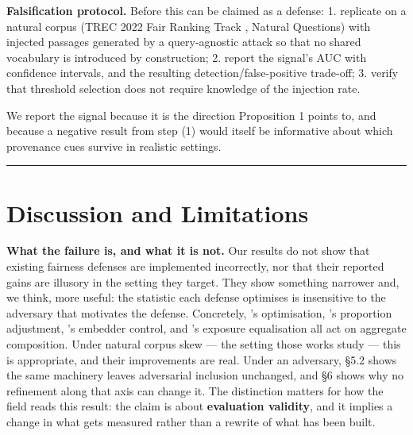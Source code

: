 \documentclass[authoryear,review,3p,times]{elsarticle}
\begin{document}
\textbf{Falsification protocol.} Before this can be claimed as a defense:
1. replicate on a natural corpus (TREC 2022 Fair Ranking Track \citep{ekstrand2022b}, Natural Questions) with injected passages generated by a query-agnostic attack \citeyearpar{zhang2025} so that no shared vocabulary is introduced by construction;
2. report the signal's AUC with confidence intervals, and the resulting detection/false-positive trade-off;
3. verify that threshold selection does not require knowledge of the injection rate.

We report the signal because it is the direction Proposition 1 points to, and because a negative result from step (1) would itself be informative about which provenance cues survive in realistic settings.

\begin{center}\rule{0.5\linewidth}{0.5pt}\end{center}

\section{Discussion and Limitations}\label{discussion-and-limitations}

\textbf{What the failure is, and what it is not.} Our results do not show that existing fairness defenses are implemented incorrectly, nor that their reported gains are illusory in the setting they target. They show something narrower and, we think, more useful: the statistic each defense optimises is insensitive to the adversary that motivates the defense. Concretely, \citeauthor{zhao2026}'s optimisation, \citeauthor{wu2025}'s proportion adjustment, \citeauthor{kim2025a}'s embedder control, and \citeauthor{kim2025b}'s exposure equalisation all act on aggregate composition. Under natural corpus skew --- the setting those works study --- this is appropriate, and their improvements are real. Under an adversary, §5.2 shows the same machinery leaves adversarial inclusion unchanged, and §6 shows why no refinement along that axis can change it. The distinction matters for how the field reads this result: the claim is about \textbf{evaluation validity}, and it implies a change in what gets measured rather than a rewrite of what has been built.
\end{document}
